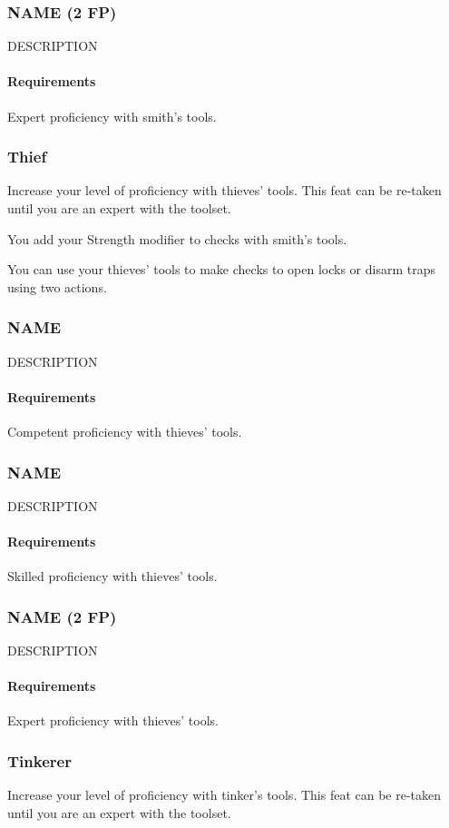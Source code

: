 \subsubsection{NAME (2 FP)} \label{feat::name}
    DESCRIPTION %
    \paragraph{Requirements} Expert proficiency with smith's tools.

\subsubsection{Thief} \label{feat::thief}
    Increase your level of proficiency with thieves' tools.
    This feat can be re-taken until you are an expert with the toolset.

    You add your Strength modifier to checks with smith's tools.

    You can use your thieves' tools to make checks to open locks or disarm traps using two actions.
\subsubsection{NAME} \label{feat::name}
    DESCRIPTION
    \paragraph{Requirements} Competent proficiency with thieves' tools.
\subsubsection{NAME} \label{feat::name}
    DESCRIPTION
    \paragraph{Requirements} Skilled proficiency with thieves' tools.
\subsubsection{NAME (2 FP)} \label{feat::name}
    DESCRIPTION
    \paragraph{Requirements} Expert proficiency with thieves' tools.

\subsubsection{Tinkerer} \label{feat::tinkerer}
    Increase your level of proficiency with tinker's tools.
    This feat can be re-taken until you are an expert with the toolset.

